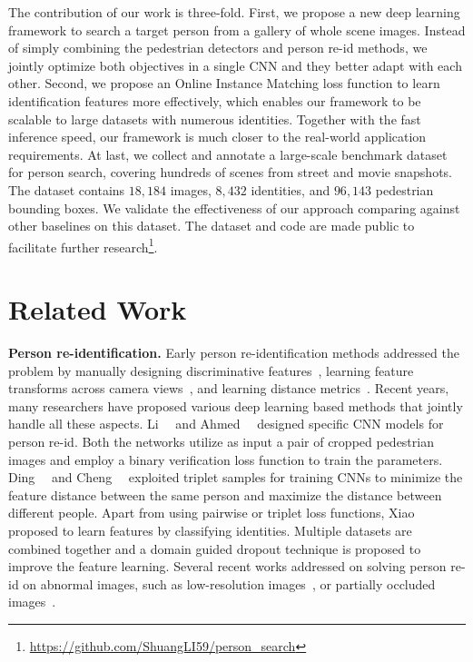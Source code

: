 \documentclass[10pt,twocolumn,letterpaper]{article}
\begin{document}
The contribution of our work is three-fold. First, we propose a new deep learning framework to search a target person from a gallery of whole scene images. Instead of simply combining the pedestrian detectors and person re-id methods, we jointly optimize both objectives in a single CNN and they better adapt with each other. Second, we propose an Online Instance Matching loss function to learn identification features more effectively, which enables our framework to be scalable to large datasets with numerous identities. Together with the fast inference speed, our framework is much closer to the real-world application requirements. At last, we collect and annotate a large-scale benchmark dataset for person search, covering hundreds of scenes from street and movie snapshots. The dataset contains $18,184$ images, $8,432$ identities, and $96,143$ pedestrian bounding boxes. We validate the effectiveness of our approach comparing against other baselines on this dataset. The dataset and code are made public to facilitate further research\footnote{\url{https://github.com/ShuangLI59/person_search}}.

\section{Related Work} %
\label{sec:related_work}
\textbf{Person re-identification.} Early person re-identification methods addressed the problem by manually designing discriminative features~\cite{wang2007shape,hamdoun2008person,zhao2013unsupervised}, learning feature transforms across camera views~\cite{prosser2010person,porikli2003inter,shen2015person}, and learning distance metrics~\cite{zheng2011person,gray2008viewpoint,prosser2010person,paisitkriangkrai2015learning,liao2015efficient}. Recent years, many researchers have proposed various deep learning based methods that jointly handle all these aspects. Li~\etal~\cite{li2014deepreid} and Ahmed~\etal~\cite{ahmed2015improved} designed specific CNN models for person re-id. Both the networks utilize as input a pair of cropped pedestrian images and employ a binary verification loss function to train the parameters. Ding~\etal~\cite{ding2015deep} and Cheng~\etal~\cite{cheng2016person} exploited triplet samples for training CNNs to minimize the feature distance between the same person and maximize the distance between different people. Apart from using pairwise or triplet loss functions, Xiao~\etal~\cite{xiao2016learning} proposed to learn features by classifying identities. Multiple datasets are combined together and a domain guided dropout technique is proposed to improve the feature learning. Several recent works addressed on solving person re-id on abnormal images, such as low-resolution images~\cite{li2015multi}, or partially occluded images~\cite{zheng2015partial}.
\end{document}

